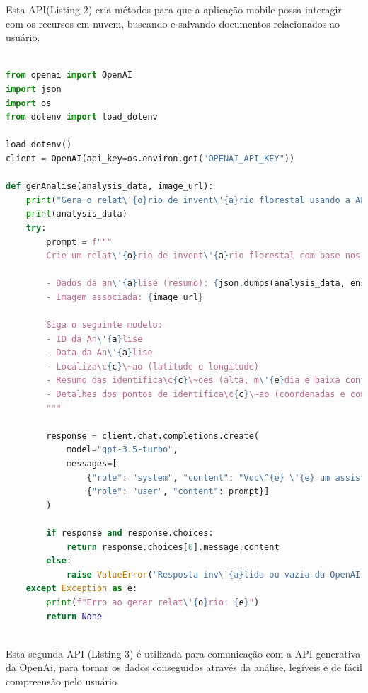 \documentclass[
  a4paper,%
  12pt,%
  english,%
  brazilian,%
]{article}
\begin{document}
Esta API(Listing 2) cria métodos para que a aplicação mobile possa interagir com os recursos em nuvem, buscando e salvando documentos relacionados ao usuário.

\begin{lstlisting}[language=Python, caption={API para comunica\c{c}\~ao com AI generativa OpenAI}]

from openai import OpenAI
import json
import os
from dotenv import load_dotenv

load_dotenv()
client = OpenAI(api_key=os.environ.get("OPENAI_API_KEY"))

def genAnalise(analysis_data, image_url):
    print("Gera o relat\'{o}rio de invent\'{a}rio florestal usando a API do OpenAI.")
    print(analysis_data)
    try:
        prompt = f"""
        Crie um relat\'{o}rio de invent\'{a}rio florestal com base nos seguintes dados:

        - Dados da an\'{a}lise (resumo): {json.dumps(analysis_data, ensure_ascii=False, indent=2)[:1000]}...
        - Imagem associada: {image_url}

        Siga o seguinte modelo:
        - ID da An\'{a}lise
        - Data da An\'{a}lise
        - Localiza\c{c}\~ao (latitude e longitude)
        - Resumo das identifica\c{c}\~oes (alta, m\'{e}dia e baixa confian\c{c}a)
        - Detalhes dos pontos de identifica\c{c}\~ao (coordenadas e confian\c{c}a)
        """

        response = client.chat.completions.create(
            model="gpt-3.5-turbo",
            messages=[
                {"role": "system", "content": "Voc\^{e} \'{e} um assistente especializado em cria\c{c}\~ao de relat\'{o}rios."},
                {"role": "user", "content": prompt}]
        )

        if response and response.choices:
            return response.choices[0].message.content
        else:
            raise ValueError("Resposta inv\'{a}lida ou vazia da OpenAI API.")
    except Exception as e:
        print(f"Erro ao gerar relat\'{o}rio: {e}")
        return None
    
\end{lstlisting}
    
Esta segunda API (Listing 3) é utilizada para comunicação com a API generativa da OpenAi, para tornar os dados conseguidos através da análise, legíveis e de fácil compreensão pelo usuário.
        
\end{document}

